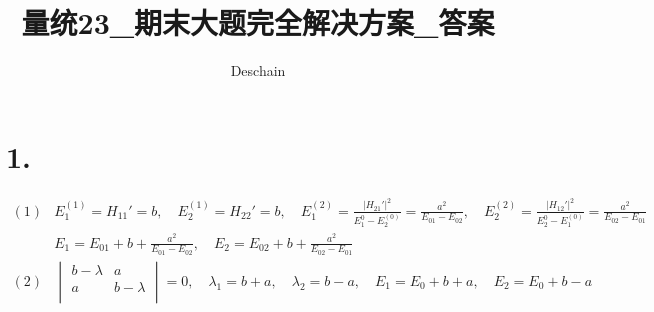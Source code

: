 \documentclass[UTF8]{ctexart}
\title{量统23\_期末大题完全解决方案\_答案}
\author{Deschain}
\begin{document}
\maketitle
\section*{1.}
\begin{equation*}
  \begin{aligned}
    (1) & E_1^{(1)}=H_{11}'=b,\quad E_2^{(1)}=H_{22}'=b,\quad E_1^{(2)}=\frac
    {\lvert H_{21}'\rvert^2}{E_1^{0}-E_2^{(0)}}=\frac{a^2}{E_{01}-E_{02}},\quad
    E_2^{(2)}=\frac{\lvert H_{12}'\rvert^2}{E_2^{0}-E_1^{(0)}}=\frac{a^2}{E_{02}-
    E_{01}}                                                                                    \\
        & E_1=E_{01}+b+\frac{a^2}{E_{01}-E_{02}},\quad
    E_2=E_{02}+b+\frac{a^2}{E_{02}-E_{01}}                                                     \\
    (2) & \begin{vmatrix}
      b-\lambda & a         \\
      a         & b-\lambda \\
    \end{vmatrix}=0,\quad\lambda_1=b+a,\quad\lambda_2=b-a,\quad E_1=E_0+b+a,
    \quad E_2=E_0+b-a                                                                          \\
  \end{aligned}
\end{equation*}
\end{document}
